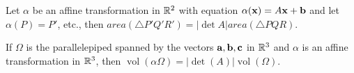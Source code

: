 \begin{theorem}
    \begin{statements}{}
        \item Let \(\alpha\) be an affine transformation in \(\mathbb{R}^2\) with equation \(\alpha(\mathbf{x}) = A\mathbf{x} + \mathbf{b}\) and let \(\alpha(P) = P'\), etc., then \(area(\triangle P'Q'R') = |\det A|area(\triangle PQR)\).
        \item If \(\Omega\) is the parallelepiped spanned by the vectors \(\mathbf{a}, \mathbf{b}, \mathbf{c}\) in \(\mathbb{R}^3\) and \(\alpha\) is an affine transformation in \(\mathbb{R}^3\), then \(\operatorname{vol}(\alpha \Omega) = |\det(A)|\operatorname{vol}(\Omega)\).
    \end{statements}
\end{theorem}